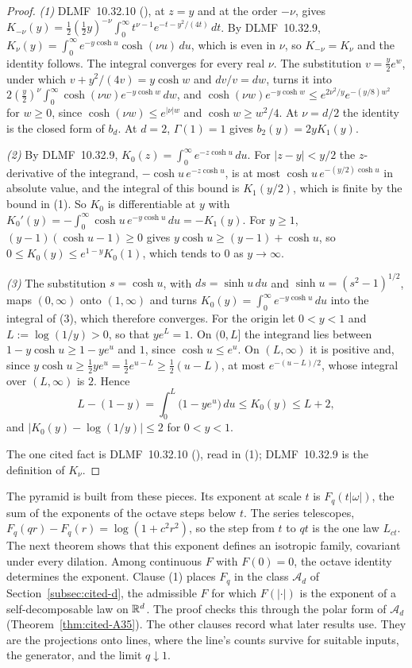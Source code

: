 \begin{proof}
\emph{(1)} DLMF~10.32.10 (), at $z = y$ and at the order $-\nu$, gives
$K_{-\nu}(y) = \tfrac12(\tfrac12y)^{-\nu}\int_0^\infty t^{\nu-1}e^{-t - y^2/(4t)}\,dt$. By
DLMF~10.32.9, $K_\nu(y) = \int_0^\infty e^{-y\cosh u}\cosh(\nu u)\,du$, which is even in $\nu$, so
$K_{-\nu} = K_\nu$ and the identity follows. The integral converges for every real $\nu$. The
substitution $v = \tfrac y2e^w$, under which $v + y^2/(4v) = y\cosh w$ and $dv/v = dw$, turns it into
$2(\tfrac y2)^\nu\int_0^\infty\cosh(\nu w)e^{-y\cosh w}\,dw$, and
$\cosh(\nu w)e^{-y\cosh w} \le e^{2\nu^2/y}e^{-(y/8)w^2}$ for $w \ge 0$, since
$\cosh(\nu w) \le e^{|\nu|w}$ and $\cosh w \ge w^2/4$. At $\nu = d/2$ the identity is the closed form
of $b_d$. At $d = 2$, $\Gamma(1) = 1$ gives $b_2(y) = 2yK_1(y)$.

\emph{(2)} By DLMF~10.32.9, $K_0(z) = \int_0^\infty e^{-z\cosh u}\,du$. For $|z - y| < y/2$ the
$z$-derivative of the integrand, $-\cosh u\,e^{-z\cosh u}$, is at most
$\cosh u\,e^{-(y/2)\cosh u}$ in absolute value, and the integral of this bound is $K_1(y/2)$, which is
finite by the bound in (1). So $K_0$ is differentiable at $y$ with
$K_0'(y) = -\int_0^\infty\cosh u\,e^{-y\cosh u}\,du = -K_1(y)$. For $y \ge 1$,
$(y - 1)(\cosh u - 1) \ge 0$ gives $y\cosh u \ge (y - 1) + \cosh u$, so
$0 \le K_0(y) \le e^{1-y}K_0(1)$, which tends to $0$ as $y \to \infty$.

\emph{(3)} The substitution $s = \cosh u$, with $ds = \sinh u\,du$ and
$\sinh u = (s^2 - 1)^{1/2}$, maps $(0,\infty)$ onto $(1,\infty)$ and turns
$K_0(y) = \int_0^\infty e^{-y\cosh u}\,du$ into the integral of (3), which therefore converges. For the
origin let $0 < y < 1$ and $L := \log(1/y) > 0$, so that $ye^L = 1$. On $(0, L]$ the integrand lies
between $1 - y\cosh u \ge 1 - ye^u$ and $1$, since $\cosh u \le e^u$. On $(L, \infty)$ it is positive
and, since $y\cosh u \ge \tfrac12ye^u = \tfrac12e^{u-L} \ge \tfrac12(u - L)$, at most
$e^{-(u-L)/2}$, whose integral over $(L,\infty)$ is $2$. Hence
\[
  L - (1 - y) = \int_0^L\bigl(1 - ye^u\bigr)\,du \le K_0(y) \le L + 2 ,
\]
and $|K_0(y) - \log(1/y)| \le 2$ for $0 < y < 1$.

The one cited fact is DLMF~10.32.10 (), read in (1); DLMF~10.32.9 is the definition of
$K_\nu$.
\end{proof}

The pyramid is built from these pieces. Its exponent at scale $t$ is $F_q(t|\omega|)$, the sum of
the exponents of the octave steps below $t$. The series telescopes,
$F_q(qr) - F_q(r) = \log(1 + c^2r^2)$, so the step from $t$ to $qt$ is the one law $L_{ct}$. The
next theorem shows that this exponent defines an isotropic family, covariant under every dilation.
Among continuous $F$ with $F(0) = 0$, the octave identity determines the exponent. Clause (1)
places $F_q$ in the class $\mathcal{A}_d$ of Section~\ref{subsec:cited-d}, the admissible $F$ for
which $F(|\cdot|)$ is the exponent of a self-decomposable law on $\mathbb{R}^d$. The proof checks this
through the polar form of $\mathcal{A}_d$ (Theorem~\ref{thm:cited-A35}). The other clauses record
what later results use. They are the projections onto lines, where the line's counts survive for
suitable inputs, the generator, and the limit $q \downarrow 1$.

